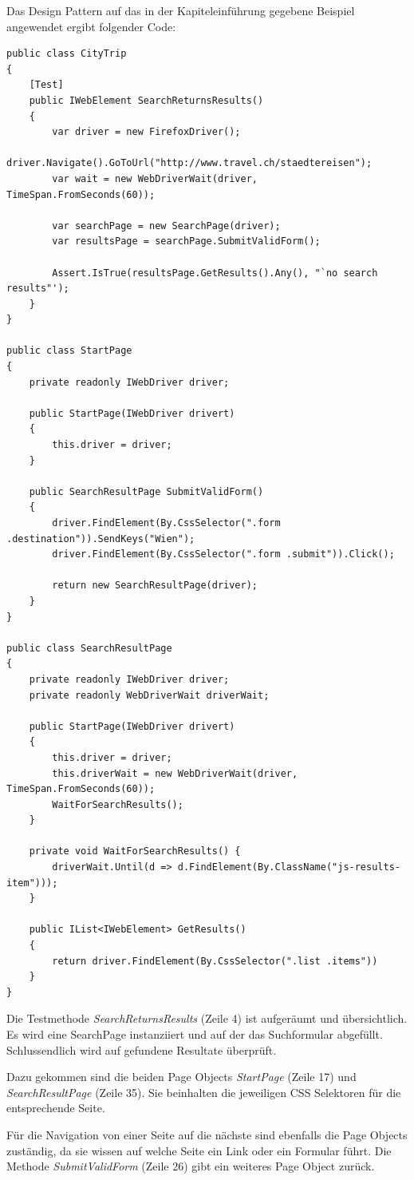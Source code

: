 Das Design Pattern auf das in der Kapiteleinführung gegebene Beispiel angewendet ergibt folgender Code:
\begin{lstlisting}
public class CityTrip
{	    	
	[Test]
	public IWebElement SearchReturnsResults() 
	{
		var driver = new FirefoxDriver();
		driver.Navigate().GoToUrl("http://www.travel.ch/staedtereisen");
		var wait = new WebDriverWait(driver, TimeSpan.FromSeconds(60));
		
		var searchPage = new SearchPage(driver);
		var resultsPage = searchPage.SubmitValidForm();
		
		Assert.IsTrue(resultsPage.GetResults().Any(), "`no search results"');
	}
}

public class StartPage
{
	private readonly IWebDriver driver;
	
	public StartPage(IWebDriver drivert)
	{
		this.driver = driver;
	}
	
	public SearchResultPage SubmitValidForm() 
	{
	   	driver.FindElement(By.CssSelector(".form .destination")).SendKeys("Wien");
	   	driver.FindElement(By.CssSelector(".form .submit")).Click();
	   	
	   	return new SearchResultPage(driver);
	}
}

public class SearchResultPage
{
	private readonly IWebDriver driver;
	private readonly WebDriverWait driverWait;
	
	public StartPage(IWebDriver drivert)
	{
		this.driver = driver;
		this.driverWait = new WebDriverWait(driver, TimeSpan.FromSeconds(60));
		WaitForSearchResults();
	}
	
	private void WaitForSearchResults() {
	   	driverWait.Until(d => d.FindElement(By.ClassName("js-results-item")));
	}
		
	public IList<IWebElement> GetResults() 
	{
	   	return driver.FindElement(By.CssSelector(".list .items"))
	}
}
\end{lstlisting}

Die Testmethode \textit{SearchReturnsResults} (Zeile 4) ist aufgeräumt und übersichtlich. Es wird eine SearchPage instanziiert und auf der das Suchformular abgefüllt. Schlussendlich wird auf gefundene Resultate überprüft.

Dazu gekommen sind die beiden Page Objects \textit{StartPage} (Zeile 17) und \textit{SearchResultPage} (Zeile 35). Sie beinhalten die jeweiligen CSS Selektoren für die entsprechende Seite.

Für die Navigation von einer Seite auf die nächste sind ebenfalls die Page Objects zuständig, da sie wissen auf welche Seite ein Link oder ein Formular führt. Die Methode \textit{SubmitValidForm} (Zeile 26) gibt ein weiteres Page Object zurück.  

